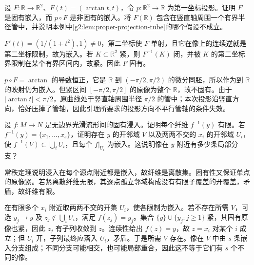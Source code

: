\begin{exercise}\label{g2:ex:projection-loses-properness}
	设 \(F:\mathbb R\to\mathbb R^2\)、\(F(t)=(\arctan t,t)\)，令 \(p:\mathbb R^2\to\mathbb R\) 为第一坐标投影。证明 \(F\) 是固有嵌入，而 \(p\circ F\) 是非固有的嵌入。将 \(F(\mathbb R)\) 包含在竖直轴周围一个有界半径管中，并说明本例中\cref{g2:lem:proper-projection-tube}的哪个假设不成立。
\end{exercise}
\begin{solution}
	\(F'(t)=(1/(1+t^2),1)\ne0\)，第二坐标使 \(F\) 单射，且它在像上的连续逆就是第二坐标限制，故为嵌入。若 \(K\subset\mathbb R^2\) 紧，则 \(F^{-1}(K)\) 闭，并被 \(K\) 的第二坐标界限制在某个有界区间内，故紧。因此 \(F\) 固有。

	\(p\circ F=\arctan\) 的导数恒正，它是 \(\mathbb R\) 到 \((-\pi/2,\pi/2)\) 的微分同胚，所以作为到 \(\mathbb R\) 的映射仍为嵌入。但紧区间 \([-\pi/2,\pi/2]\) 的原像为整个 \(\mathbb R\)，故不固有。由于 \(|\arctan t|<\pi/2\)，原曲线处于竖直轴周围半径 \(\pi/2\) 的管中；本次投影沿竖直方向，恰好压掉了管轴，因此引理所要求的投影方向不平行管轴的条件失效。
\end{solution}

\begin{exercise}\label{g2:ex:proper-immersion-finite-branches}
	设 \(f:M\to N\) 是无边界光滑流形间的固有浸入。证明每个纤维 \(f^{-1}(y)\) 有限。若 \(f^{-1}(y)=\{x_1,\ldots,x_s\}\)，证明存在 \(y\) 的开邻域 \(V\) 以及两两不交的 \(x_i\) 的开邻域 \(U_i\)，使 \(f^{-1}(V)\subset\bigcup_iU_i\)，且每个 \(f|_{U_i}\) 为嵌入。这说明像在 \(y\) 附近有多少条局部分支？
\end{exercise}
\begin{solution}
	常秩定理说明浸入在每个源点附近都是嵌入，故纤维是离散集。固有性又保证单点的原像紧。若紧离散纤维无限，其逐点孤立邻域构成没有有限子覆盖的开覆盖，矛盾，故纤维有限。

	在有限多个 \(x_i\) 附近取两两不交的开集 \(U_i\)，使各限制为嵌入。若不存在所需 \(V\)，可选 \(y_j\to y\) 及 \(z_j\notin\bigcup_iU_i\)，满足 \(f(z_j)=y_j\)。集合 \(\{y\}\cup\{y_j:j\ge1\}\) 紧，其固有原像也紧，因此 \(z_j\) 有子列收敛到 \(z\)。连续性给出 \(f(z)=y\)，故 \(z=x_i\) 对某个 \(i\) 成立；但 \(U_i\) 开，子列最终应落入 \(U_i\)，矛盾。于是所需 \(V\) 存在。像在 \(V\) 中由 \(s\) 条嵌入分支组成；不同分支可能相交，也可能局部重合，因此这不等于它们有 \(s\) 个不同的像。
\end{solution}

